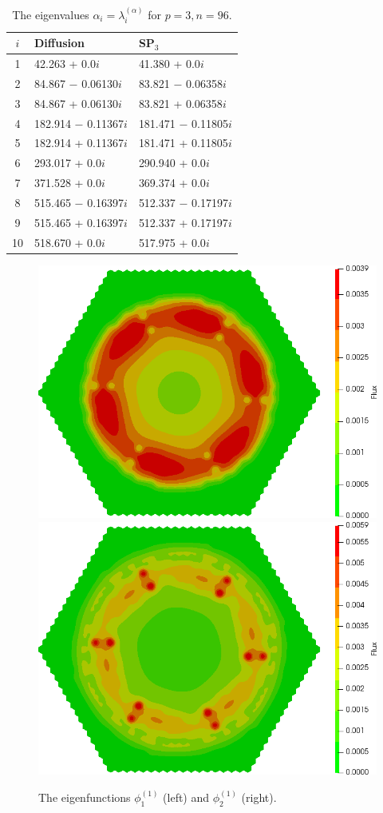 \documentclass[authoryear]{elsarticle}
\begin{document}
\begin{table}[h]
\caption{The eigenvalues $\alpha_i=\lambda_i^{(\alpha)}$ for $p=3, n=96$.}
\label{tab:hwr_alpha_10}
\begin{center}
\begin{tabular}{c l l}
\hline
$i$ & Diffusion & SP$_3$ \\
\hline
1 &\phantom{0}42.263 + 0.0$i$       &41.380 + 0.0$i$ \\
2 &\phantom{0}84.867 $-$ 0.06130$i$ &83.821 $-$ 0.06358$i$ \\
3 &\phantom{0}84.867 + 0.06130$i$   &83.821 + 0.06358$i$ \\
4 &182.914 $-$ 0.11367$i$           &181.471 $-$ 0.11805$i$ \\
5 &182.914 + 0.11367$i$             &181.471 + 0.11805$i$ \\
6 &293.017 + 0.0$i$                 &290.940 + 0.0$i$ \\
7 &371.528 + 0.0$i$                 &369.374 + 0.0$i$ \\
8 &515.465 $-$ 0.16397$i$           &512.337 $-$ 0.17197$i$ \\
9 &515.465 + 0.16397$i$             &512.337 + 0.17197$i$ \\
10&518.670 + 0.0$i$                 &517.975 + 0.0$i$ \\
\hline
\end{tabular}
\end{center}
\end{table}

\begin{figure}[h]
\begin{center}
	\includegraphics[width=0.49\linewidth]{hwr/alpha_sp3_rx1_1.png}
	\includegraphics[width=0.49\linewidth]{hwr/alpha_sp3_rx2_1.png}\\
	\caption{The eigenfunctions $\phi^{(1)}_1$ (left) and $\phi^{(1)}_2$ (right).}
	\label{fig:hwr_fun_1}
\end{center}
\end{figure}
\end{document}
